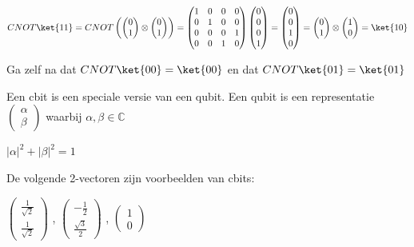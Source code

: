 $
CNOT\ket{11}=CNOT
\begin{pmatrix}
\begin{pmatrix}
0\\
1
\end{pmatrix}
\otimes
\begin{pmatrix}
0\\
1
\end{pmatrix}
\end{pmatrix}
=
\begin{pmatrix}
1&0&0&0\\
0&1&0&0\\
0&0&0&1\\
0&0&1&0\\
\end{pmatrix}
\begin{pmatrix}
0\\
0\\
0\\
1
\end{pmatrix}
=
\begin{pmatrix}
0\\
0\\
1\\
0
\end{pmatrix}
=
\begin{pmatrix}
0\\
1
\end{pmatrix}
\otimes
\begin{pmatrix}
1\\
0
\end{pmatrix}
=
\ket{10}
$

Ga zelf na dat $CNOT\ket{00} = \ket{00}$ en dat $CNOT\ket{01} = \ket{01}$

Een cbit is een speciale versie van een qubit. Een qubit is een representatie $\begin{pmatrix}
\alpha\\
\beta
\end{pmatrix}
$ waarbij $\alpha, \beta\in \mathbb{C}$

${|\alpha|}^2 +{|\beta|}^2 = 1$

De volgende 2-vectoren zijn voorbeelden van cbits:

$\begin{pmatrix}
\tfrac{1}{\sqrt{2}}\\
\tfrac{1}{\sqrt{2}}
\end{pmatrix}
$
, $\begin{pmatrix}
-\tfrac{1}{2}\\
\tfrac{\sqrt{3}}{2}
\end{pmatrix}
$
, $\begin{pmatrix}
1\\
0
\end{pmatrix}
$

